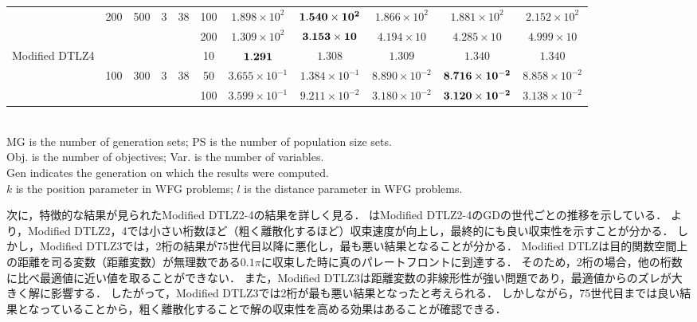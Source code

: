 \documentclass[../main/main]{subfiles}
\begin{document}
\begin{table}[htbp]
\begin{tabular}{c|ccccc|c|c|c|c|c}
  				   & 200 & 500 & 3 & 38 &100 &$1.898 \times 10^{2}$ &  $\bf{1.540 \times 10^{2}}$ & $1.866 \times 10^{2}$ & $1.881 \times 10^{2}$ & $2.152 \times 10^{2}$\\
				   &        &      &&  &200 & $1.309 \times 10^{2}$ & $\bf{3.153 \times 10}$ & $4.194 \times 10$ & $4.285 \times 10$ & $4.999 \times 10$\\
\hline
\multirow{3}{*}{\fontsize{6.5pt}{0pt}\selectfont Modified DTLZ4} & &&       &       & 10 &$\bf{1.291}$ & $1.308$ & $1.309$ & $1.340$ & $1.340$\\
  				   & 100 & 300 & 3 & 38 &50 &$3.655 \times 10^{-1}$ &  $1.384 \times 10^{-1}$ & $8.890 \times 10^{-2}$ & $\bf{8.716 \times 10^{-2}}$ & $8.858 \times 10^{-2}$\\
				   &        &      &&  &100 & $3.599 \times 10^{-1}$ & $9.211 \times 10^{-2}$ & $3.180 \times 10^{-2}$ & $\bf{3.120 \times 10^{-2}}$ & $3.138 \times 10^{-2}$\\
			   
\hline
\end{tabular}\\
{\footnotesize MG is the number of generation sets; PS is the number of population size sets.}\\
{\footnotesize Obj. is the number of objectives; Var. is the number of variables.}\\
{\footnotesize Gen indicates the generation on which the results were computed.} \\
{\footnotesize $k$ is the position parameter in WFG problems; $l$ is the distance parameter in WFG problems.}\\
\end{table}

\clearpage

次に，特徴的な結果が見られたModified DTLZ2-4の結果を詳しく見る．
はModified DTLZ2-4のGDの世代ごとの推移を示している．
より，Modified DTLZ2，4では小さい桁数ほど（粗く離散化するほど）収束速度が向上し，最終的にも良い収束性を示すことが分かる．
しかし，Modified DTLZ3では，2桁の結果が75世代目以降に悪化し，最も悪い結果となることが分かる．
Modified DTLZは目的関数空間上の距離を司る変数（距離変数）が無理数である$0.1\pi$に収束した時に真のパレートフロントに到達する．
そのため，2桁の場合，他の桁数に比べ最適値に近い値を取ることができない．
また，Modified DTLZ3は距離変数の非線形性が強い問題であり，最適値からのズレが大きく解に影響する．
したがって，Modified DTLZ3では2桁が最も悪い結果となったと考えられる．
しかしながら，75世代目までは良い結果となっていることから，粗く離散化することで解の収束性を高める効果はあることが確認できる．
\end{document}
